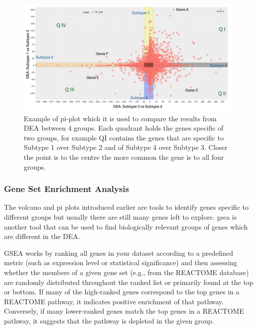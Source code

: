 \begin{figure}[!htb]    
    \centering
    \includegraphics[width=1.0\textwidth,height=1.0\textheight,keepaspectratio]{Sections/Lit_review/Resources/pi_explainer.png}
    \caption[Example - Pi plot]{Example of pi-plot which it is used to compare the results from DEA between 4 groups. Each quadrant holds the genes specific of two groups, for example QI contains the genes that are specific to  Subtype 1 over Subtype 2 and of Subtype 4 over Subtype 3. Closer the point is to the centre the more common the gene is to all four groups.}
    \label{fig:lit:pi_eg}
\end{figure}

\subsubsection{Gene Set Enrichment Analysis} \label{s:lit:gsea}

The volcano and pi plots introduced earlier are tools to identify genes specific to different groups but usually there are still many genes left to explore. \acrlong{gsea} is another tool that can be used to find biologically relevant groups of genes which are different in the DEA. 

GSEA works by ranking all genes in your dataset according to a predefined metric (such as expression level or statistical significance) and then assessing whether the members of a given gene set (e.g., from the REACTOME database) are randomly distributed throughout the ranked list or primarily found at the top or bottom. If many of the high-ranked genes correspond to the top genes in a REACTOME pathway, it indicates positive enrichment of that pathway. Conversely, if many lower-ranked genes match the top genes in a REACTOME pathway, it suggests that the pathway is depleted in the given group.

